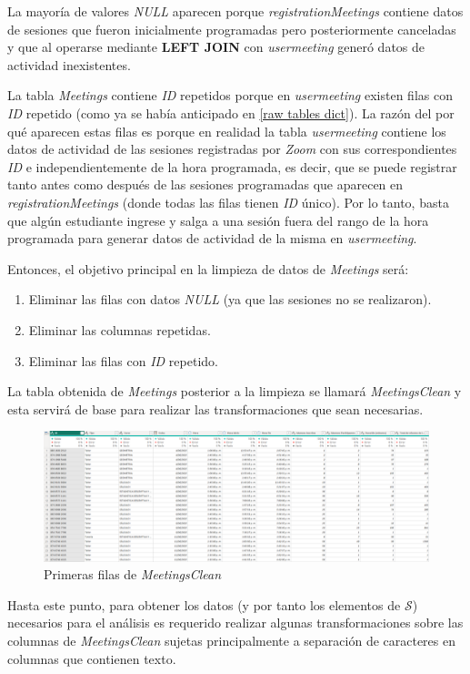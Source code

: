\documentclass[11pt,a4paper]{book}
\theoremstyle{definition}%
\begin{document}
                La mayoría de valores \textit{NULL} aparecen porque \textit{registrationMeetings} contiene datos de sesiones que fueron inicialmente programadas pero posteriormente canceladas y que al operarse mediante \textbf{LEFT JOIN} con \textit{usermeeting} generó datos de actividad inexistentes.
                
                La tabla \textit{Meetings} contiene \textit{ID} repetidos porque en \textit{usermeeting} existen filas con \textit{ID} repetido (como ya se había anticipado en \ref{raw tables dict}). La razón del por qué aparecen estas filas es porque en realidad la tabla \textit{usermeeting} contiene los datos de actividad de las sesiones registradas por \textit{Zoom} con sus correspondientes \textit{ID} e independientemente de la hora programada, es decir, que se puede registrar tanto antes como después de las sesiones programadas que aparecen en \textit{registrationMeetings} (donde todas las filas tienen \textit{ID} único). Por lo tanto, basta que algún estudiante ingrese y salga a una sesión fuera del rango de la hora programada para generar datos de actividad de la misma en \textit{usermeeting}.

                Entonces, el objetivo principal en la limpieza de datos de \textit{Meetings} será:
                \begin{enumerate}\label{pasos transformation}
                    \item Eliminar las filas con datos \textit{NULL} (ya que las sesiones no se realizaron).
                    \item Eliminar las columnas repetidas.
                    \item Eliminar las filas con \textit{ID} repetido.
                \end{enumerate}
                La tabla obtenida de \textit{Meetings} posterior a la limpieza se llamará \textit{MeetingsClean} y esta servirá de base para realizar las transformaciones que sean necesarias.
                \begin{figure}[H]
                    \centering
                    \includegraphics[width=1\textwidth]{Sources/MeetingsClean_Head.png}
                    \caption{Primeras filas de \textit{MeetingsClean}}
                    \label{fig:meetingsclean_head}
                \end{figure}
                Hasta este punto, para obtener los datos (y por tanto los elementos de $\mathcal{S}$) necesarios para el análisis es requerido realizar algunas transformaciones sobre las columnas de \textit{MeetingsClean} sujetas principalmente a separación de caracteres en columnas que contienen texto.
\end{document}
